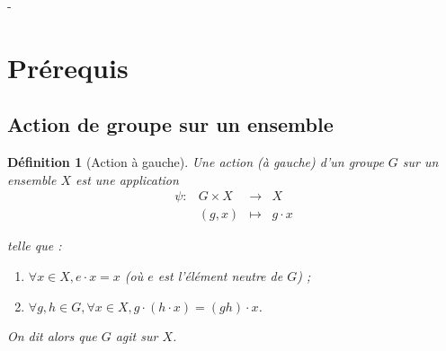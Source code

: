 \documentclass[french]{article}
\title{\bsc{Théorie des représentations}}
\date{\today}
\author{Anastasiia \bsc{Chernetcova}}
\newtheorem{definition}{Définition}[section]
\begin{document}
\maketitle

\tableofcontents

-%

\section{Prérequis}

\subsection{Action de groupe sur un ensemble}

\begin{definition}[Action à gauche]

  Une action (à gauche) d'un groupe \(G\) sur un ensemble \(X\) est une application
  \[\begin{matrix}
  \psi : & G \times X & \longrightarrow & X \\
  \ & (g,x) & \longmapsto & g \cdot x
  \end{matrix}\]

  telle que :

  \begin{enumerate}
    \item \(\forall x \in X, e \cdot x = x\) (où \(e\) est l'élément neutre de \(G\)) ;
    \item \(\forall g, h \in G, \forall x \in X, g \cdot (h \cdot x) = (gh) \cdot x\).
  \end{enumerate}

  On dit alors que \(G\) agit sur \(X\).
\end{definition}
\end{document}
